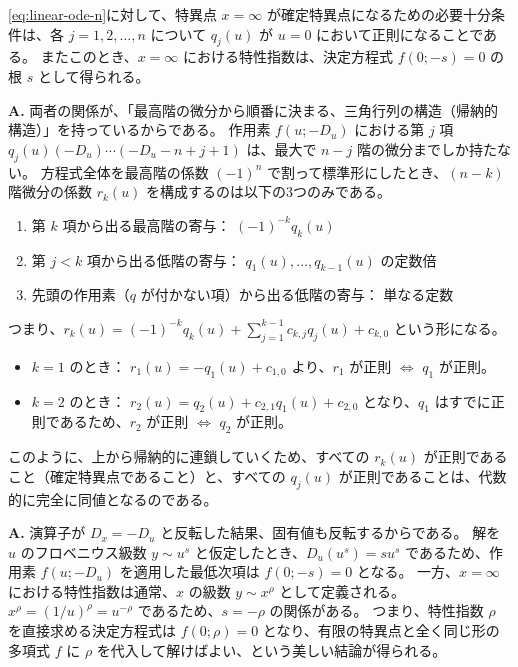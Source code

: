 \begin{proposition}\label{prop:infinity_fuchs_q}
\eqref{eq:linear-ode-n}に対して、特異点 $x=\infty$ が確定特異点になるための必要十分条件は、各 $j = 1, 2, \dots, n$ について $q_{j}(u)$ が $u=0$ において正則になることである。
またこのとき、$x=\infty$ における特性指数は、決定方程式 $f(0; -s) = 0$ の根 $s$ として得られる。
\end{proposition}

\begin{Q}
\textbf{A.} 両者の関係が、「最高階の微分から順番に決まる、三角行列の構造（帰納的構造）」を持っているからである。
作用素 $f(u; -D_{u})$ における第 $j$ 項 $q_{j}(u) (-D_{u})\cdots(-D_{u}-n+j+1)$ は、最大で $n-j$ 階の微分までしか持たない。
方程式全体を最高階の係数 $(-1)^{n}$ で割って標準形にしたとき、$(n-k)$ 階微分の係数 $r_{k}(u)$ を構成するのは以下の3つのみである。
\begin{enumerate}
    \item 第 $k$ 項から出る最高階の寄与： $(-1)^{-k} q_{k}(u)$
    \item 第 $j < k$ 項から出る低階の寄与： $q_{1}(u), \dots, q_{k-1}(u)$ の定数倍
    \item 先頭の作用素（$q$ が付かない項）から出る低階の寄与： 単なる定数
\end{enumerate}
つまり、$r_{k}(u) = (-1)^{-k} q_{k}(u) + \sum_{j=1}^{k-1} c_{k,j} q_{j}(u) + c_{k,0}$ という形になる。
\begin{itemize}
    \item $k=1$ のとき： $r_{1}(u) = -q_{1}(u) + c_{1,0}$ より、$r_{1}$ が正則 $\iff$ $q_{1}$ が正則。
    \item $k=2$ のとき： $r_{2}(u) = q_{2}(u) + c_{2,1}q_{1}(u) + c_{2,0}$ となり、$q_{1}$ はすでに正則であるため、$r_{2}$ が正則 $\iff$ $q_{2}$ が正則。
\end{itemize}
このように、上から帰納的に連鎖していくため、すべての $r_{k}(u)$ が正則であること（確定特異点であること）と、すべての $q_{j}(u)$ が正則であることは、代数的に完全に同値となるのである。
\end{Q}

\begin{Q}[【核心】決定方程式が $f(0; s)=0$ ではなく $f(0; -s)=0$ となるのはなぜか。また、この根 $s$ は「$x=\infty$ における特性指数」とどう対応するのか？]
\textbf{A.} 演算子が $D_{x} = -D_{u}$ と反転した結果、固有値も反転するからである。
解を $u$ のフロベニウス級数 $y \sim u^{s}$ と仮定したとき、$D_{u} (u^{s}) = s u^{s}$ であるため、作用素 $f(u; -D_{u})$ を適用した最低次項は $f(0; -s) = 0$ となる。
一方、$x=\infty$ における特性指数は通常、$x$ の級数 $y \sim x^{\rho}$ として定義される。$x^{\rho} = (1/u)^{\rho} = u^{-\rho}$ であるため、$s = -\rho$ の関係がある。
つまり、特性指数 $\rho$ を直接求める決定方程式は $f(0; \rho) = 0$ となり、有限の特異点と全く同じ形の多項式 $f$ に $\rho$ を代入して解けばよい、という美しい結論が得られる。
\end{Q}

